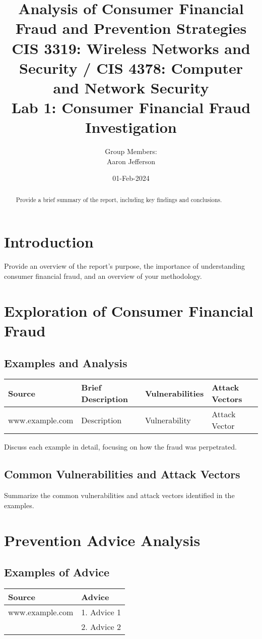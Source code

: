\documentclass[11pt]{article}
\title{Analysis of Consumer Financial Fraud and Prevention Strategies \\
\large CIS 3319: Wireless Networks and Security / CIS 4378: Computer and Network Security \\
\large Lab 1: Consumer Financial Fraud Investigation}
\author{Group Members: \\ Aaron Jefferson \\ }
\date{01-Feb-2024}
\begin{document}
\maketitle

\begin{abstract}
\noindent Provide a brief summary of the report, including key findings and conclusions.
\end{abstract}

\tableofcontents

\section{Introduction}
Provide an overview of the report's purpose, the importance of understanding consumer financial fraud, and an overview of your methodology.

\section{Exploration of Consumer Financial Fraud}
\subsection{Examples and Analysis}
\begin{tabular}{@{}llll@{}}
\toprule
\textbf{Source} & \textbf{Brief Description} & \textbf{Vulnerabilities} & \textbf{Attack Vectors} \\ \midrule
www.example.com & Description & Vulnerability & Attack Vector \\
\bottomrule
\end{tabular}

Discuss each example in detail, focusing on how the fraud was perpetrated.

\subsection{Common Vulnerabilities and Attack Vectors}
Summarize the common vulnerabilities and attack vectors identified in the examples.

\section{Prevention Advice Analysis}
\subsection{Examples of Advice}
\begin{tabular}{@{}ll@{}}
\toprule
\textbf{Source} & \textbf{Advice} \\ \midrule
www.example.com & 1. Advice 1 \\ 
                & 2. Advice 2 \\
\bottomrule
\end{tabular}
\end{document}
